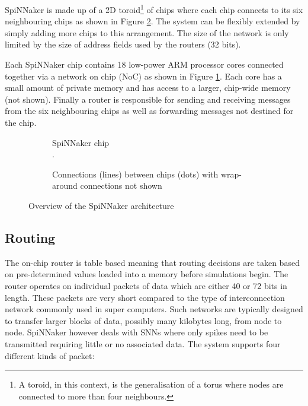 			SpiNNaker is made up of a 2D toroid\footnote{A toroid, in this context, is
			the generalisation of a torus where nodes are connected to more than four
			neighbours.} of chips where each chip connects to its six neighbouring
			chips as shown in Figure \ref{fig:spinnaker-chips}. The system can be
			flexibly extended by simply adding more chips to this arrangement. The
			size of the network is only limited by the size of address fields used by
			the routers (32 bits).
			
			Each SpiNNaker chip contains 18 low-power ARM processor cores connected
			together via a network on chip (NoC) as shown in Figure
			\ref{fig:spinnaker-chip}. Each core has a small amount of private memory
			and has access to a larger, chip-wide memory (not shown). Finally a router
			is responsible for sending and receiving messages from the six
			neighbouring chips as well as forwarding messages not destined for the
			chip.
			
			\begin{figure}
				\center
				\begin{subfigure}[b]{0.49\textwidth}
					\center
					
					\caption{SpiNNaker chip\\\color{white}.}
					\label{fig:spinnaker-chip}
				\end{subfigure}
				\begin{subfigure}[b]{0.49\textwidth}
					\center
					
					\caption{Connections (lines) between chips (dots) with wrap-around
					connections not shown}
					\label{fig:spinnaker-chips}
				\end{subfigure}
				
				\caption{Overview of the SpiNNaker architecture}
				\label{fig:spinnaker-architecture}
			\end{figure}
		
		\subsection{Routing}
			
			
			The on-chip router is table based meaning that routing decisions are taken
			based on pre-determined values loaded into a memory before simulations
			begin. The router operates on individual packets of data which are either
			40 or 72 bits in length. These packets are very short compared to the type
			of interconnection network commonly used in super computers. Such networks
			are typically designed to transfer larger blocks of data, possibly many
			kilobytes long, from node to node. SpiNNaker however deals with SNNs where
			only spikes need to be transmitted requiring little or no associated data.
			The system supports four different kinds of packet:
			
